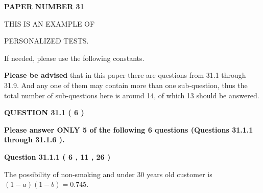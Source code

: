 \documentclass[12pt]{article}
\begin{document}
   
   
   
\newpage 
\setcounter{page}{ 
    31001 } 
   
   
   
   
 {\textbf{ \Large{ PAPER NUMBER           31  }}}
   
   
\vspace{0.2in}
   
   
   
   
   
   
 \vspace{0.2in}
 
 
{\Huge  THIS IS AN EXAMPLE OF}
 
{\Huge  PERSONALIZED TESTS. }
 
If needed, please use the following constants.
 
 
 
{\textbf{\large{Please be advised}}} that in this paper there are questions from
31.1 through
31.9.
And any one of them may contain more than one sub-question, thus the total number
of sub-questions here is around 14, of which
13 should be answered.
 
\vspace{0.3in}
 
 
   
   
  
\vspace{0.2in}
  
{\textbf{\Large{QUESTION
31.1 
 (           6 )
}}}
  
  
{\textbf{\Large{Please answer ONLY  %
           5  %
 of the following  %
           6  %
 questions (Questions  %
31.1.1 %
 through  %
31.1.6 %
 ). }}}
   
   
  
\vspace{0.2in}
  
{\textbf{\Large{Question
31.1.1 
 (           6 ,          11 ,          26 )
}}}
  
  
 
 
\noindent{}

The possibility of  %
 non-smoking and  %
under 30 years old
customer is $ (1-a)(1-b) =  %
0.745 $.
 
 
  
\vspace{0.2in}
  
\end{document}

